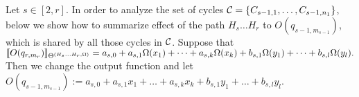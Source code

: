 Let $s\in [2,r]$. In order to analyze the set of cycles ${\mathcal{C} }=\{C_{s-1,1},\dots,C_{s-1,n_1}\}$, below we show how to summarize effect of the path $H_s\dots H_r$ to $O(q_{s-1, m_{s-1}})$, which is shared by all those cycles in ${\mathcal{C} }$.
Suppose that $\llbracket O(q_{r,m_r})\rrbracket_{\Theta^{(H_s\dots H_{r}, \Omega)}}=a_{s, 0}+a_{s, 1} \Omega(x_1)+ \dots + a_{s, k} \Omega(x_k) + b_{s,1} \Omega(y_1) + \dots + b_{s, l} \Omega(y_l).$ 
Then we change the output function and let
$O(q_{s-1, m_{s-1}}):=a_{s, 0}+a_{s, 1} x_1 + \dots + a_{s, k} x_k + b_{s,1} y_1 + \dots + b_{s, l} y_l.$\smallskip\\
\smallskip

